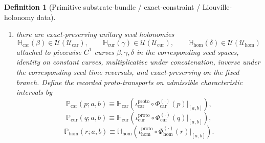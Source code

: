 \documentclass[11pt]{article}
\newcommand{\RootTensorClass}{\mathscr U_{\mathrm{car}}}
\newcommand{\RootRelabelClass}{\mathscr U_{\mathrm{cur}}}
\newcommand{\RootFreeClass}{\mathscr U_{\mathrm{hom}}}
\newcommand{\CurFlowField}{X_{\mathrm{cur}}}
\newcommand{\HomFlowField}{X_{\mathrm{hom}}}
\newcommand{\TensorOrbitFlow}{\Phi_{\mathrm{car}}}
\newcommand{\CurOrbitFlow}{\Phi_{\mathrm{cur}}}
\newcommand{\HomOrbitFlow}{\Phi_{\mathrm{hom}}}
\newcommand{\CurCharForm}{\boldsymbol{\theta}_{\mathrm{cur}}}
\newcommand{\HomCharForm}{\boldsymbol{\theta}_{\mathrm{hom}}}
\newcommand{\CurCharTwo}{\boldsymbol{\omega}_{\mathrm{cur}}}
\newcommand{\HomCharTwo}{\boldsymbol{\omega}_{\mathrm{hom}}}
\newcommand{\TensorProtoTransport}{\mathbb P_{\mathrm{car}}}
\newcommand{\CurProtoTransport}{\mathbb P_{\mathrm{cur}}}
\newcommand{\HomProtoTransport}{\mathbb P_{\mathrm{hom}}}
\newcommand{\TensorProtoInc}{\iota_{\mathrm{car}}^{\mathrm{proto}}}
\newcommand{\CurProtoInc}{\iota_{\mathrm{cur}}^{\mathrm{proto}}}
\newcommand{\HomProtoInc}{\iota_{\mathrm{hom}}^{\mathrm{proto}}}
\newcommand{\TensorSeedTransport}{\mathbb H_{\mathrm{car}}}
\newcommand{\CurSeedTransport}{\mathbb H_{\mathrm{cur}}}
\newcommand{\HomSeedTransport}{\mathbb H_{\mathrm{hom}}}
\newtheorem{definition}{Definition}
\begin{document}
\begin{definition}[Primitive substrate-bundle / exact-constraint / Liouville-holonomy data]
\begin{enumerate}
\begin{equation}
    \label{eq:seed_char_kernel_car}
    \end{equation}
    \begin{equation}
    \iota_{\CurFlowField}\CurCharTwo=0,
    \qquad
    \CurCharForm(\CurFlowField)=1,
    \label{eq:seed_char_kernel_cur}
    \end{equation}
    \begin{equation}
    \iota_{\HomFlowField}\HomCharTwo=0,
    \qquad
    \HomCharForm(\HomFlowField)=1.
    \label{eq:seed_char_kernel_hom}
    \end{equation}
    Assume these vector fields are complete, with flows denoted \(\TensorOrbitFlow^\sigma,\CurOrbitFlow^\sigma,\HomOrbitFlow^\sigma\).
    \item there are exact-preserving unitary seed holonomies
    \[
    \TensorSeedTransport(\beta)\in\mathcal U(\RootTensorClass),\qquad
    \CurSeedTransport(\gamma)\in\mathcal U(\RootRelabelClass),\qquad
    \HomSeedTransport(\delta)\in\mathcal U(\RootFreeClass)
    \]
    attached to piecewise \(C^1\) curves \(\beta,\gamma,\delta\) in the corresponding seed spaces, identity on constant curves, multiplicative under concatenation, inverse under the corresponding seed time reversals, and exact-preserving on the fixed branch. Define the recorded proto-transports on admissible characteristic intervals by
    \begin{equation}
    \TensorProtoTransport(p;a,b)
    \equiv
    \TensorSeedTransport\!\left(\TensorProtoInc\circ\TensorOrbitFlow^{(\cdot)}(p)\big|_{[a,b]}\right),
    \label{eq:proto_transport_from_seed_car}
    \end{equation}
    \begin{equation}
    \CurProtoTransport(q;a,b)
    \equiv
    \CurSeedTransport\!\left(\CurProtoInc\circ\CurOrbitFlow^{(\cdot)}(q)\big|_{[a,b]}\right),
    \label{eq:proto_transport_from_seed_cur}
    \end{equation}
    \begin{equation}
    \HomProtoTransport(r;a,b)
    \equiv
    \HomSeedTransport\!\left(\HomProtoInc\circ\HomOrbitFlow^{(\cdot)}(r)\big|_{[a,b]}\right).
    \label{eq:proto_transport_from_seed_hom}
    \end{equation}
\end{enumerate}


\end{definition}
\end{document}
